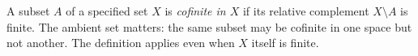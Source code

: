 
A subset $A$ of a specified set $X$ is \emph{cofinite in $X$} if its relative complement $X\setminus A$ is finite. The ambient set matters: the same subset may be cofinite in one space but not another. The definition applies even when $X$ itself is finite.
